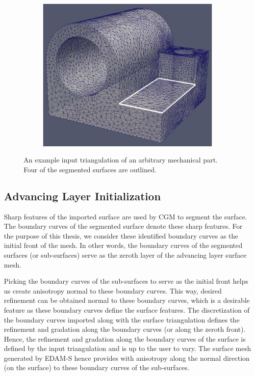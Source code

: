 \begin{figure}
\begin{subfigure}{.5\textwidth}
  \caption{}
  \label{surf2}
\end{subfigure}%
\begin{subfigure}{.5\textwidth}
  \centering
  \includegraphics[width=.8\linewidth]{img/m1/surfSegmentation/surf7.eps}
  \caption{}
  \label{surf3}
\end{subfigure}
\caption{An example input triangulation of an arbitrary mechanical part. Four of the segmented surfaces are outlined.}
\label{fig-surfSegment}
\end{figure}

\subsection{Advancing Layer Initialization}

Sharp features of the imported surface are used by CGM to segment the surface. The boundary curves of the segmented surface denote these sharp features. For the purpose of this thesis, we consider these identified boundary curves as the initial front of the mesh. In other words, the boundary curves of the segmented surfaces (or sub-surfaces) serve as the zeroth layer of the advancing layer surface mesh.

Picking the boundary curves of the sub-surfaces to serve as the initial front helps us create anisotropy normal to these boundary curves. This way, desired refinement can be obtained normal to these boundary curves, which is a desirable feature as these boundary curves define the surface features. The discretization of the boundary curves imported along with the surface triangulation defines the refinement and gradation along the boundary curves (or along the zeroth front). Hence, the refinement and gradation along the boundary curves of the surface is defined by the input triangulation and is up to the user to vary. The surface mesh generated by EDAM-S hence provides with anisotropy along the normal direction (on the surface) to these boundary curves of the sub-surfaces.

